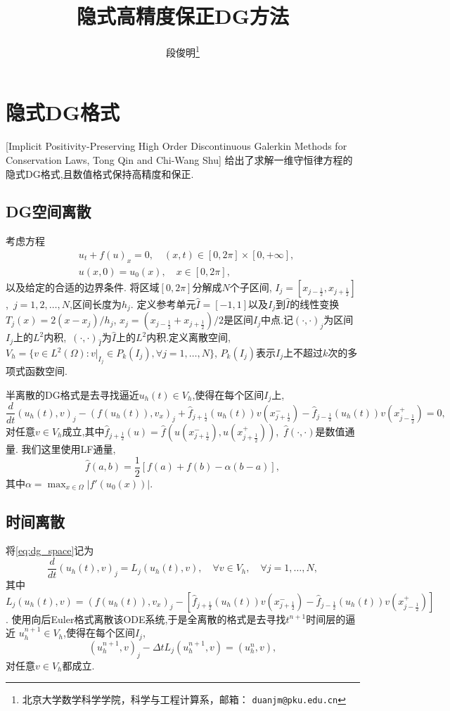 \documentclass[a4paper, 11pt]{ctexart}
\title{隐式高精度保正DG方法}
\author{段俊明\thanks{北京大学数学科学学院，科学与工程计算系，邮箱： {\tt duanjm@pku.edu.cn}} }
\numberwithin{equation}{section}
\numberwithin{figure}{section}
\newcommand\abs[1]{\lvert #1 \rvert}
\begin{document}
\maketitle

\section{隐式DG格式}
[Implicit Positivity-Preserving High Order Discontinuous Galerkin Methods for
  Conservation Laws, Tong Qin and Chi-Wang Shu]
  给出了求解一维守恒律方程的隐式DG格式,且数值格式保持高精度和保正.

\subsection{DG空间离散}
考虑方程
\begin{align}
  &u_t+f(u)_x=0,\quad (x,t)\in[0,2\pi]\times[0,+\infty],\\
  &u(x,0)=u_0(x),\quad x\in[0,2\pi],
\end{align}
以及给定的合适的边界条件.
将区域$[0,2\pi]$分解成$N$个子区间,
$I_j=[x_{j-\frac12},x_{j+\frac12}]$,~$j=1,2,\dots,N$,区间长度为$h_j$.
定义参考单元$\hat I=[-1,1]$以及$I_j$到$\hat I$的线性变换$T_j(x)=2(x-x_j)/h_j$,
$x_j=(x_{j-\frac12}+x_{j+\frac12})/2$是区间$I_j$中点.记$(\cdot,\cdot)_j$为区间
$I_j$上的$L^2$内积,~$(\cdot,\cdot)_{\hat I}$为$\hat I$上的$L^2$内积.定义离散空间,
$V_h=\{v\in L^2(\Omega): v|_{I_j}\in P_k(I_j),\forall j=1,\dots,N\}$,
$P_k(I_j)$表示$I_j$上不超过$k$次的多项式函数空间.

半离散的DG格式是去寻找逼近$u_h(t)\in V_h$,使得在每个区间$I_j$上,
\begin{equation}
  \dfrac{d}{dt}(u_h(t),v)_j-(f(u_h(t)),v_x)_j+\hat
  f_{j+\frac12}(u_h(t))v(x_{j+\frac12}^-)-\hat
  f_{j-\frac12}(u_h(t))v(x_{j-\frac12}^+)=0,
  \label{eq:dg_space}
\end{equation}
对任意$v\in V_h$成立,其中$\hat f_{j+\frac12}(u)=\hat f(u(x_{j+\frac12}^-),
u(x_{j+\frac12}^+))$,~$\hat f(\cdot,\cdot)$是数值通量.
我们这里使用LF通量,
\begin{equation}
  \hat f(a,b)=\dfrac12[f(a)+f(b)-\alpha(b-a)],
\end{equation}
其中$\alpha=\max_{x\in\Omega}\abs{f'(u_0(x))}$.

\subsection{时间离散}
将\eqref{eq:dg_space}记为
\begin{equation}
  \dfrac{d}{dt}(u_h(t),v)_j=L_j(u_h(t),v),\quad \forall v\in V_h,\quad \forall
  j=1,\dots,N,
\end{equation}
其中$L_j(u_h(t),v)= (f(u_h(t)),v_x)_j-[\hat
  f_{j+\frac12}(u_h(t))v(x_{j+\frac12}^-)-\hat
f_{j-\frac12}(u_h(t))v(x_{j-\frac12}^+)]$.
使用向后Euler格式离散该ODE系统,于是全离散的格式是去寻找$t^{n+1}$时间层的逼近
$u_h^{n+1}\in V_h$,使得在每个区间$I_j$,
\begin{equation}
  (u_h^{n+1},v)_j-\Delta t L_j(u_h^{n+1},v)=(u_h^n,v),
  \label{eq:dg_full}
\end{equation}
对任意$v\in V_h$都成立.
\end{document}
